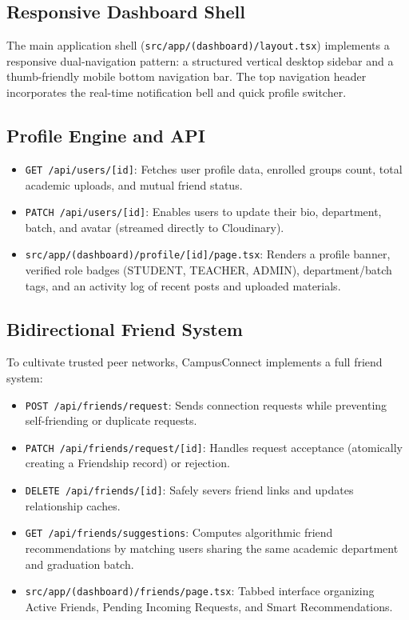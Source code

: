\documentclass[11pt,a4paper]{report}
\begin{document}
\subsection{Responsive Dashboard Shell}

The main application shell (\texttt{src/app/(dashboard)/layout.tsx}) implements a responsive dual-navigation pattern: a structured vertical desktop sidebar and a thumb-friendly mobile bottom navigation bar. The top navigation header incorporates the real-time notification bell and quick profile switcher.

\subsection{Profile Engine and API}

\begin{itemize}
    \item \texttt{GET /api/users/[id]}: Fetches user profile data, enrolled groups count, total academic uploads, and mutual friend status.
    \item \texttt{PATCH /api/users/[id]}: Enables users to update their bio, department, batch, and avatar (streamed directly to Cloudinary).
    \item \texttt{src/app/(dashboard)/profile/[id]/page.tsx}: Renders a profile banner, verified role badges (STUDENT, TEACHER, ADMIN), department/batch tags, and an activity log of recent posts and uploaded materials.
\end{itemize}

\subsection{Bidirectional Friend System}

To cultivate trusted peer networks, CampusConnect implements a full friend system:

\begin{itemize}
    \item \texttt{POST /api/friends/request}: Sends connection requests while preventing self-friending or duplicate requests.
    \item \texttt{PATCH /api/friends/request/[id]}: Handles request acceptance (atomically creating a Friendship record) or rejection.
    \item \texttt{DELETE /api/friends/[id]}: Safely severs friend links and updates relationship caches.
    \item \texttt{GET /api/friends/suggestions}: Computes algorithmic friend recommendations by matching users sharing the same academic department and graduation batch.
    \item \texttt{src/app/(dashboard)/friends/page.tsx}: Tabbed interface organizing Active Friends, Pending Incoming Requests, and Smart Recommendations.
\end{itemize}
\end{document}
